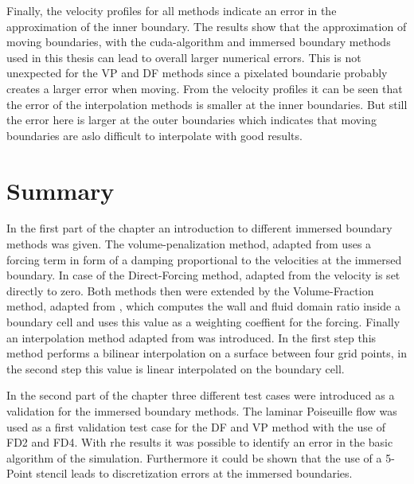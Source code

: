Finally, the velocity profiles for all methods indicate an error in the approximation of the inner boundary.
The results show that the approximation of moving boundaries, with the cuda-algorithm and immersed boundary methods used in this thesis can
lead to overall larger numerical errors.
This is not unexpected for the VP and DF methods since a pixelated boundarie probably creates a larger error when moving.
From the velocity profiles it can be seen that the error of the interpolation methods is smaller  at the inner boundaries.
But still the error here is larger at the outer boundaries which indicates that moving boundaries are aslo difficult to interpolate with good results.



\clearpage

\section{Summary}

In the first part of the chapter an introduction to different immersed boundary methods was given.
The volume-penalization method, adapted from  \citep{Lulff2011} uses a forcing term in form of a damping proportional to the velocities at the immersed boundary.
In case of the Direct-Forcing method, adapted from \citep{Fadlun2000} the velocity is set directly to zero.
Both methods then were extended by the Volume-Fraction method, adapted from \citep{Fadlun2000}, which computes the wall and fluid domain ratio inside a boundary
cell and uses this value as a weighting coeffient for the forcing.
Finally an interpolation method adapted from  \citep{ Gilmanov2003} was introduced. In the first step this method performs a bilinear interpolation on a  surface
between four grid points, in the second step this value is linear interpolated on the boundary cell.

In the second part of the chapter three different test cases were introduced as a validation for the immersed boundary methods.
The laminar Poiseuille flow was used as a first validation test case for the DF and VP method with the use of FD2 and FD4.
With rhe results it was possible to identify an error in the basic algorithm of the simulation.
Furthermore it could be shown that the use of a 5-Point stencil leads to discretization errors at the immersed boundaries.

